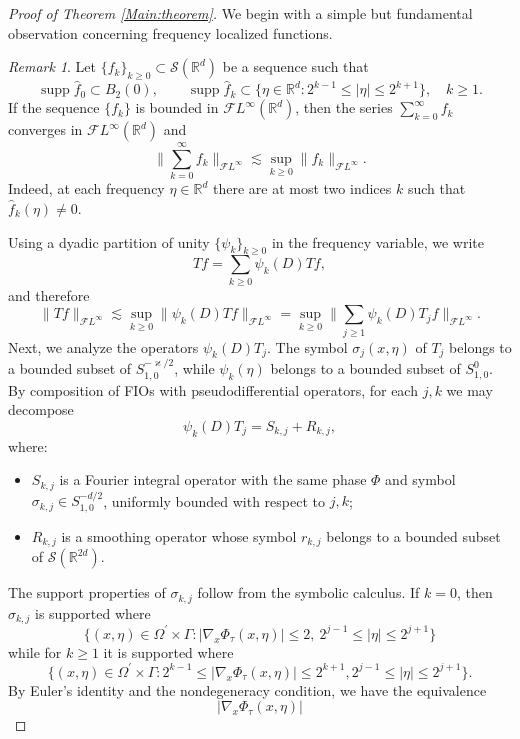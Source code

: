 \documentclass[12pt, reqno]{amsart}
\theoremstyle{definition}
\theoremstyle{remark}
\newtheorem{remark}[theorem]{Remark}
\numberwithin{equation}{section}
\begin{document}
\begin{proof}[Proof of Theorem \ref{Main:theorem}]
We begin with a simple but fundamental observation concerning frequency localized
functions.
\begin{remark}
Let $\{f_k\}_{k\ge0}\subset \mathcal{S}(\mathbb{R}^d)$ be a sequence such that
\[
\operatorname{supp}\widehat f_0\subset B_2(0),
\qquad
\operatorname{supp}\widehat f_k\subset
\{\eta\in\mathbb{R}^d:2^{k-1}\le|\eta|\le2^{k+1}\},\quad k\ge1.
\]
If the sequence $\{f_k\}$ is bounded in $\mathcal{F}L^\infty(\mathbb{R}^d)$, then
the series $\sum_{k=0}^\infty f_k$ converges in $\mathcal{F}L^\infty(\mathbb{R}^d)$ and
\[
\Big\|\sum_{k=0}^\infty f_k\Big\|_{\mathcal{F}L^\infty}
\lesssim \sup_{k\ge0}\|f_k\|_{\mathcal{F}L^\infty}.
\]
Indeed, at each frequency $\eta\in\mathbb{R}^d$ there are at most two indices $k$
such that $\widehat f_k(\eta)\neq0$.
\end{remark}
Using a dyadic partition of unity $\{\psi_k\}_{k\ge0}$ in the frequency variable, we write
\[
Tf=\sum_{k\ge0}\psi_k(D)Tf,
\]
and therefore
\begin{equation}\label{inf}
\|Tf\|_{\mathcal{F}L^\infty}
\lesssim
\sup_{k\ge0}\|\psi_k(D)Tf\|_{\mathcal{F}L^\infty}
=
\sup_{k\ge0}\Big\|\sum_{j\ge1}\psi_k(D)T_jf\Big\|_{\mathcal{F}L^\infty}.
\end{equation}
Next, we analyze the operators $\psi_k(D)T_j$.
The symbol $\sigma_j(x,\eta)$ of $T_j$ belongs to a bounded subset of
$S^{-\varkappa/2}_{1,0}$, while $\psi_k(\eta)$ belongs to a bounded subset of $S^0_{1,0}$.
By composition of FIOs with pseudodifferential operators,
for each $j,k$ we may decompose
\[
\psi_k(D)T_j = S_{k,j}+R_{k,j},
\]
where:
\begin{itemize}
\item $S_{k,j}$ is a Fourier integral operator with the same phase $\Phi$ and symbol
$\sigma_{k,j}\in S^{-d/2}_{1,0}$, uniformly bounded with respect to $j,k$;
\item $R_{k,j}$ is a smoothing operator whose symbol $r_{k,j}$ belongs to a bounded
subset of $\mathcal{S}(\mathbb{R}^{2d})$.
\end{itemize}
The support properties of $\sigma_{k,j}$ follow from the symbolic calculus.
If $k=0$, then $\sigma_{k,j}$ is supported where
\[\{ (x,\eta)\in \Omega^{\prime}\times \Gamma :
|\nabla_x\Phi_\tau(x,\eta)|\le2,~
2^{j-1}\le|\eta|\le2^{j+1}\}
\]
while for $k\ge1$ it is supported where
\[ \{(x,\eta)\in \Omega^{\prime}\times \Gamma :
2^{k-1}\le|\nabla_x\Phi_\tau(x,\eta)|\le2^{k+1},
2^{j-1}\le|\eta|\le2^{j+1}\}.
\]
By Euler’s identity and the nondegeneracy condition, we have the equivalence
\[
|\nabla_x\Phi_\tau(x,\eta)|
\]
\end{proof}
\end{document}
